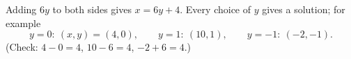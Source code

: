 Adding $6y$ to both sides gives $\boxed{x=6y+4}$. Every choice of $y$ gives a solution; for example
\[
y=0:\ (x,y)=(4,0),\qquad y=1:\ (10,1),\qquad y=-1:\ (-2,-1).
\]
(Check: $4-0=4$, $10-6=4$, $-2+6=4$.)
